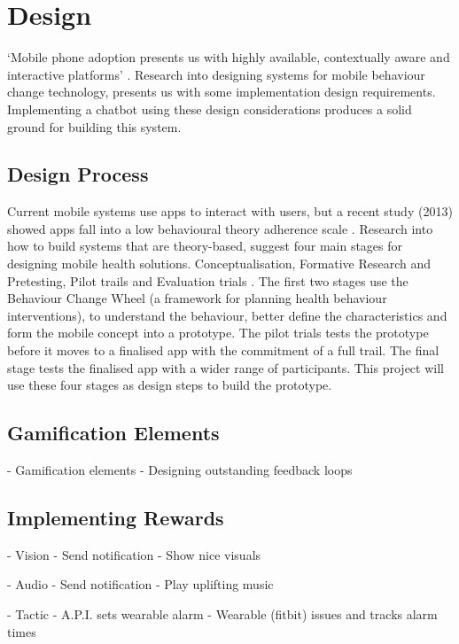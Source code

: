 
\newpage
\section{Design}
`Mobile phone adoption presents us with highly available, contextually aware and interactive platforms' \cite{article_mhealth}. Research into designing systems for mobile behaviour change technology, presents us with some implementation design requirements. Implementing a chatbot using these design considerations produces a solid ground for building this system.

\subsection*{Design Process}
Current mobile systems use apps to interact with users, but a recent study (2013) showed apps fall into a low behavioural theory adherence scale \cite{article_mhealth}. Research into how to build systems that are theory-based, suggest four main stages for designing mobile health solutions. Conceptualisation, Formative Research and Pretesting, Pilot trails and Evaluation trials \cite{article_mhealth}. The first two stages use the Behaviour Change Wheel \cite{article_behaviour_change_wheel} (a framework for planning health behaviour interventions), to understand the behaviour, better define the characteristics and form the mobile concept into a prototype. The pilot trials tests the prototype before it moves to a finalised app with the commitment of a full trail. The final stage tests the finalised app with a wider range of participants. This project will use these four stages as design steps to build the prototype.

\subsection*{Gamification Elements}
- Gamification elements \cite{article_free_to_play_making_money_from_games_you_give_away}
- Designing outstanding feedback loops \cite{website_how_to_design_feedback_loops}


\subsection{Implementing Rewards}
- Vision
  - Send notification
  - Show nice visuals

- Audio
  - Send notification
  - Play uplifting music

- Tactic
  - A.P.I. sets wearable alarm
  - Wearable (fitbit) issues and tracks alarm times

